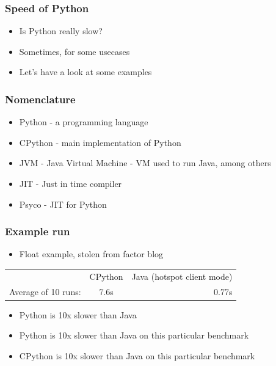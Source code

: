 \documentclass[utf8x]{beamer}
\begin{document}
\begin{frame}
  \frametitle{Speed of Python}
  \begin{itemize}
    \item Is Python really slow?
      \pause
    \item Sometimes, for some usecases
      \pause
    \item Let's have a look at some examples
  \end{itemize}

\end{frame}

\begin{frame}
  \frametitle{Nomenclature}
  \begin{itemize}
    \item Python - a programming language
    \item CPython - main implementation of Python
    \item JVM - Java Virtual Machine - VM used to run Java, among others
    \item JIT - Just in time compiler
    \item Psyco - JIT for Python
  \end{itemize}
\end{frame}

\begin{frame}
  \frametitle{Example run}
  \begin{itemize}
    \item Float example, stolen from factor blog
  \end{itemize}
  \vspace{.5cm}
  \begin{tabular}{| l | c | r |}
    \hline
    & CPython & Java (hotspot client mode) \\
    Average of 10 runs: & 7.6s & 0.77s \\
    \hline
  \end{tabular}
  \vspace{.5cm}
  \pause
  \begin{itemize}
    \item Python is 10x slower than Java
      \pause
    \item Python is 10x slower than Java on this particular benchmark
      \pause
    \item CPython is 10x slower than Java on this particular benchmark
  \end{itemize}
\end{frame}
\end{document}
